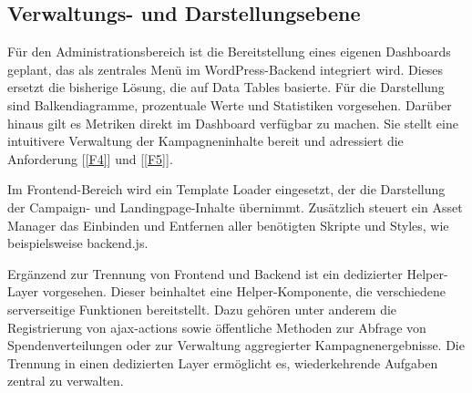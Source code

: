 \subsection{Verwaltungs- und Darstellungsebene}
Für den Administrationsbereich ist die Bereitstellung eines eigenen Dashboards geplant, das als zentrales Menü im WordPress-Backend integriert wird.
Dieses ersetzt die bisherige Lösung, die auf Data Tables basierte.
Für die Darstellung sind Balkendiagramme, prozentuale Werte und Statistiken vorgesehen.
Darüber hinaus gilt es Metriken direkt im Dashboard verfügbar zu machen.
Sie stellt eine intuitivere Verwaltung der Kampagneninhalte bereit und adressiert die Anforderung [\ref{F4}] und [\ref{F5}].

Im Frontend-Bereich wird ein Template Loader eingesetzt, der die Darstellung der Campaign- und Landingpage-Inhalte übernimmt.
Zusätzlich steuert ein Asset Manager das Einbinden und Entfernen aller benötigten Skripte und Styles, wie beispielsweise backend.js.

Ergänzend zur Trennung von Frontend und Backend ist ein dedizierter Helper-Layer vorgesehen.
Dieser beinhaltet eine Helper-Komponente, die verschiedene serverseitige Funktionen bereitstellt.
Dazu gehören unter anderem die Registrierung von \gls{ajax}-\glspl{action} sowie öffentliche Methoden zur Abfrage von Spendenverteilungen oder zur Verwaltung aggregierter Kampagnenergebnisse.
Die Trennung in einen dedizierten Layer ermöglicht es, wiederkehrende Aufgaben zentral zu verwalten.


%
